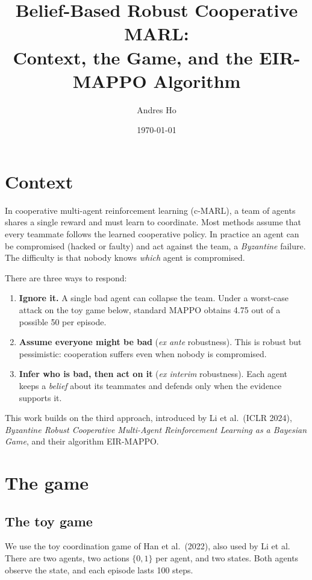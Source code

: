 \documentclass[11pt]{article}
\title{Belief-Based Robust Cooperative MARL:\\Context, the Game, and the EIR-MAPPO Algorithm}
\author{Andres Ho}
\date{\today}
\begin{document}
\maketitle

\section{Context}

In cooperative multi-agent reinforcement learning (c-MARL), a team of agents shares a
single reward and must learn to coordinate. Most methods assume that every teammate
follows the learned cooperative policy. In practice an agent can be compromised
(hacked or faulty) and act against the team, a \emph{Byzantine} failure. The difficulty
is that nobody knows \emph{which} agent is compromised.

There are three ways to respond:
\begin{enumerate}
  \item \textbf{Ignore it.} A single bad agent can collapse the team. Under a worst-case
        attack on the toy game below, standard MAPPO obtains 4.75 out of a possible 50
        per episode.
  \item \textbf{Assume everyone might be bad} (\emph{ex ante} robustness). This is robust
        but pessimistic: cooperation suffers even when nobody is compromised.
  \item \textbf{Infer who is bad, then act on it} (\emph{ex interim} robustness). Each agent
        keeps a \emph{belief} about its teammates and defends only when the evidence
        supports it.
\end{enumerate}
This work builds on the third approach, introduced by Li et al.\ (ICLR 2024),
\emph{Byzantine Robust Cooperative Multi-Agent Reinforcement Learning as a Bayesian Game},
and their algorithm EIR-MAPPO.

\section{The game}

\subsection{The toy game}
We use the toy coordination game of Han et al.\ (2022), also used by Li et al. There are
two agents, two actions $\{0,1\}$ per agent, and two states. Both agents observe the state,
and each episode lasts 100 steps.
\end{document}
